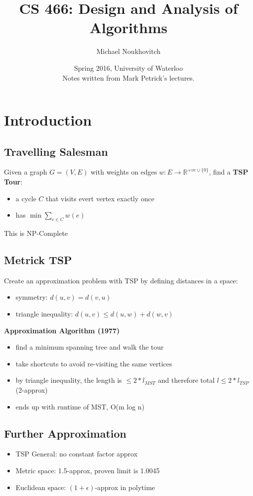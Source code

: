 \documentclass[]{article}
\theoremstyle{definition}
\begin{document}
	\let\ref\Cref

	\title{\bf{CS 466: Design and Analysis of Algorithms}}
	\date{Spring 2016, University of Waterloo \\ \center Notes written from Mark Petrick's lectures.}
	\author{Michael Noukhovitch}

	\maketitle
	\newpage
	\tableofcontents
	\newpage

	\section{Introduction}
	\subsection{Travelling Salesman}
	Given a graph $G = (V,E)$ with weights on edges $w: E \rightarrow \mathbb{R}^{+ve \cup \{0\}}$, find a \textbf{TSP Tour}:
	\begin{itemize}
		\item a cycle $C$ that visits evert vertex exactly once
		\item has $\min \sum_{e \in C} w(e)$
	\end{itemize}
	This is NP-Complete

	\subsection{Metrick TSP}
	Create an approximation problem with TSP by defining distances in a space:
	\begin{itemize}
		\item symmetry: $d(u,v) = d(v,u)$
		\item triangle inequality: $d(u,v) \le d(u,w) + d(w,v)$
	\end{itemize}
	\textbf{Approximation Algorithm (1977)}
	\begin{itemize}
		\item find a minimum spanning tree and walk the tour
		\item take shortcuts to avoid re-visiting the same vertices
		\item by triangle inequality, the length is $\le 2* l_{MST}$ and therefore total $l \le 2*l_{TSP}$ (2-approx)
		\item ends up with runtime of MST, O(m log n)
	\end{itemize}

	\subsection{Further Approximation}
	\begin{itemize}
		\item TSP General: no constant factor approx
		\item Metric space: 1.5-approx, proven limit is 1.0045
		\item Euclidean space: $(1+\epsilon)$-approx in polytime
	\end{itemize}
\end{document}

